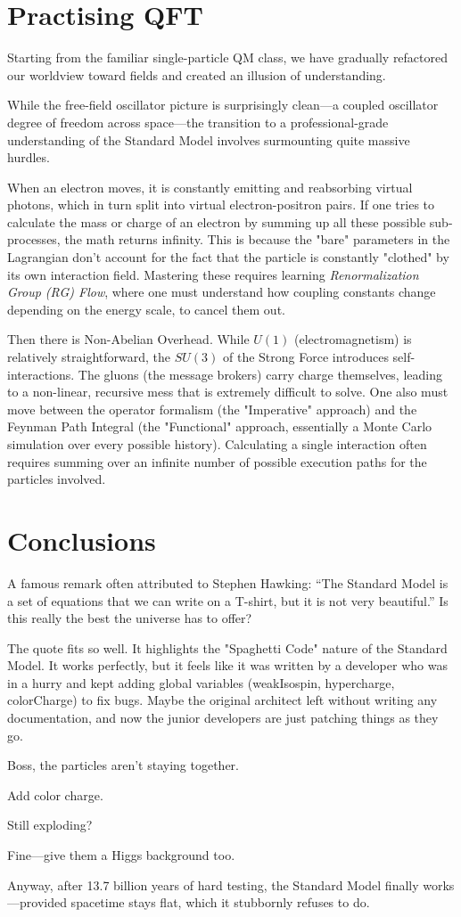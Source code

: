 \section{Practising QFT}

Starting from the familiar single-particle QM class, we have gradually refactored our worldview toward fields and
created an illusion of understanding.

While the free-field oscillator picture is surprisingly clean—a coupled oscillator degree of freedom across space—the transition to a
professional-grade understanding of the Standard Model involves surmounting quite massive hurdles.

When an electron moves, it is constantly emitting and reabsorbing virtual photons, which in turn split into virtual electron-positron pairs.
If one tries to calculate the mass or charge of an electron by summing up all these possible sub-processes, the math returns infinity.
This is because the "bare" parameters in the Lagrangian don't account for the fact that the particle is constantly "clothed" by its own interaction field.
Mastering these requires learning \textit{Renormalization Group (RG) Flow}, where one must understand how coupling constants change depending on the energy scale,
to cancel them out.

Then there is Non-Abelian Overhead. While $U(1)$ (electromagnetism) is relatively straightforward, the $SU(3)$ of the Strong Force introduces self-interactions.
The gluons (the message brokers) carry charge themselves, leading to a non-linear, recursive mess that is extremely difficult to solve.
One also must move between the operator formalism (the "Imperative" approach) and the Feynman Path Integral (the "Functional" approach,
essentially a Monte Carlo simulation over every possible history).
Calculating a single interaction often requires summing over an infinite number of possible execution paths for the particles involved.

\section{Conclusions}

A famous remark often attributed to Stephen Hawking: ``The Standard Model is a set of equations that we can write on a T-shirt, but it is not very beautiful.''
Is this really the best the universe has to offer?

The quote fits so well. It highlights the "Spaghetti Code" nature of the Standard Model.
It works perfectly, but it feels like it was written by a developer who was in a hurry and kept adding global variables (weakIsospin, hypercharge, colorCharge) to fix bugs.
Maybe the original architect left without writing any documentation, and now the junior developers are just patching things as they go.

Boss, the particles aren’t staying together.

Add color charge.

Still exploding?

Fine—give them a Higgs background too.

Anyway, after 13.7 billion years of hard testing, the Standard Model finally works—provided spacetime stays flat, which it stubbornly refuses to do.
